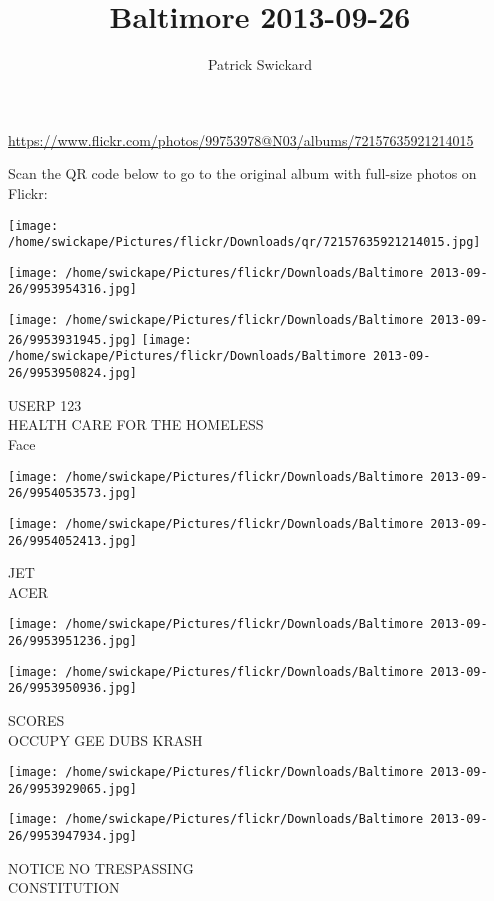 \documentclass[10pt,letterpaper]{article}
\title{Baltimore 2013-09-26}
\author{Patrick Swickard}
\date{}
\begin{document}
\maketitle

\url{https://www.flickr.com/photos/99753978@N03/albums/72157635921214015}

Scan the QR code below to go to the original album with full-size photos on Flickr:

\texttt{[image: /home/swickape/Pictures/flickr/Downloads/qr/72157635921214015.jpg]}
\pagebreak

\texttt{[image: /home/swickape/Pictures/flickr/Downloads/Baltimore 2013-09-26/9953954316.jpg]}

\vspace{0.25in}
\texttt{[image: /home/swickape/Pictures/flickr/Downloads/Baltimore 2013-09-26/9953931945.jpg]}
\texttt{[image: /home/swickape/Pictures/flickr/Downloads/Baltimore 2013-09-26/9953950824.jpg]}

USERP 123\\
HEALTH CARE FOR THE HOMELESS\\
Face
\pagebreak

\texttt{[image: /home/swickape/Pictures/flickr/Downloads/Baltimore 2013-09-26/9954053573.jpg]}

\vspace{0.25in}
\texttt{[image: /home/swickape/Pictures/flickr/Downloads/Baltimore 2013-09-26/9954052413.jpg]}

JET\\
ACER
\pagebreak

\texttt{[image: /home/swickape/Pictures/flickr/Downloads/Baltimore 2013-09-26/9953951236.jpg]}

\vspace{0.25in}
\texttt{[image: /home/swickape/Pictures/flickr/Downloads/Baltimore 2013-09-26/9953950936.jpg]}

SCORES\\
OCCUPY GEE DUBS KRASH
\pagebreak

\texttt{[image: /home/swickape/Pictures/flickr/Downloads/Baltimore 2013-09-26/9953929065.jpg]}

\vspace{0.25in}
\texttt{[image: /home/swickape/Pictures/flickr/Downloads/Baltimore 2013-09-26/9953947934.jpg]}

NOTICE NO TRESPASSING\\
CONSTITUTION
\pagebreak
\end{document}

